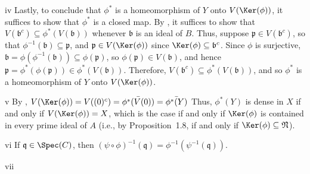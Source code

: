 \begin{partsolution}{iv}
Lastly, to conclude that \(\phi^*\) is a homeomorphism of \(Y\) onto \(V(\Ker(\phi))\), it suffices to show that \(\phi^*\) is a closed map.
By , it suffices to show that \(V(\mathfrak{b}^c) \subseteq \phi^*(V(\mathfrak{b}))\) whenever \(\mathfrak{b}\) is an ideal of \(B\).
Thus, suppose \(\mathfrak{p} \in V(\mathfrak{b}^c)\), so that \(\phi^{-1}(\mathfrak{b}) \subseteq \mathfrak{p}\), and \(\mathfrak{p} \in V(\Ker(\phi))\) since \(\Ker(\phi) \subseteq \mathfrak{b}^c\).
Since \(\phi\) is surjective, \(\mathfrak{b} = \phi(\phi^{-1}(\mathfrak{b})) \subseteq \phi(\mathfrak{p})\), so \(\phi(\mathfrak{p}) \in V(\mathfrak{b})\), and hence \(\mathfrak{p} = \phi^*(\phi(\mathfrak{p})) \in \phi^*(V(\mathfrak{b}))\).
Therefore, \(V(\mathfrak{b}^c) \subseteq \phi^*(V(\mathfrak{b}))\), and so \(\phi^*\) is a homeomorphism of \(Y\) onto \(V(\Ker(\phi))\).
\end{partsolution}

\begin{partsolution}{v}
By , \(V(\Ker(\phi)) = V((0)^c) = \bar{\phi^*(V(0))} = \bar{\phi^*(Y)}\)
Thus, \(\phi^*(Y)\) is dense in \(X\) if and only if \(V(\Ker(\phi)) = X\), which is the case if and only if \(\Ker(\phi)\) is contained in every prime ideal of \(A\) (i.e., by Proposition~1.8, if and only if \(\Ker(\phi) \subseteq \mathfrak{N}\)).
\end{partsolution}

\begin{partsolution}{vi}
If \(\mathfrak{q} \in \Spec(C)\), then \((\psi \circ \phi)^{-1}(\mathfrak{q}) = \phi^{-1}(\psi^{-1}(\mathfrak{q}))\).
\end{partsolution}

\begin{partsolution}{vii}

\end{partsolution}
